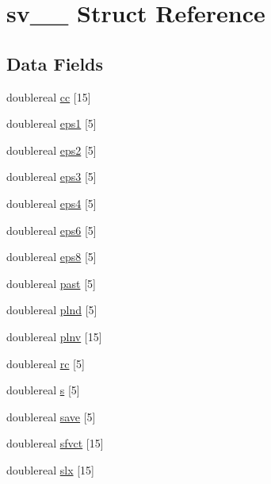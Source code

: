 \hypertarget{structsv__1__}{}\section{sv\+\_\+\_\+ Struct Reference}
\label{structsv__1__}
\subsection*{Data Fields}
\begin{DoxyCompactItemize}
\item 
doublereal \hyperlink{structsv__1___a4d829fa2396825085d8008ef846232d7}{cc} \mbox{[}15\mbox{]}
\item 
doublereal \hyperlink{structsv__1___a36ba7c34fd6dec03e93f0f2ab10cbcf3}{eps1} \mbox{[}5\mbox{]}
\item 
doublereal \hyperlink{structsv__1___ac3ac592537e4af63c79d3e76866a4391}{eps2} \mbox{[}5\mbox{]}
\item 
doublereal \hyperlink{structsv__1___a7defa9e21fe4bce5011ce3d9b0a7b1e9}{eps3} \mbox{[}5\mbox{]}
\item 
doublereal \hyperlink{structsv__1___aa65f22f44615750e1268e5bb8a040393}{eps4} \mbox{[}5\mbox{]}
\item 
doublereal \hyperlink{structsv__1___aa28ef65cbfdceb301d5e6b42a959eff3}{eps6} \mbox{[}5\mbox{]}
\item 
doublereal \hyperlink{structsv__1___a74d64ca6dc191d2553855f82017a089f}{eps8} \mbox{[}5\mbox{]}
\item 
doublereal \hyperlink{structsv__1___a5b1db8c4c47306f0ac441f1c69b197ed}{past} \mbox{[}5\mbox{]}
\item 
doublereal \hyperlink{structsv__1___a275dabf0aa8168ee1f97b4236e8e70e7}{plnd} \mbox{[}5\mbox{]}
\item 
doublereal \hyperlink{structsv__1___aacac114ec75f0d240feb24700d1b1f70}{plnv} \mbox{[}15\mbox{]}
\item 
doublereal \hyperlink{structsv__1___a6570078dd83e74c9e9010377b48621b4}{rc} \mbox{[}5\mbox{]}
\item 
doublereal \hyperlink{structsv__1___aa27f56a6d561835454c4e78f79cbc968}{s} \mbox{[}5\mbox{]}
\item 
doublereal \hyperlink{structsv__1___a66cf511363f6a8ece1800160d76a4216}{save} \mbox{[}5\mbox{]}
\item 
doublereal \hyperlink{structsv__1___a0150b65e0d64c17cb84a00da84f87333}{sfvct} \mbox{[}15\mbox{]}
\item 
doublereal \hyperlink{structsv__1___a8d3f7cabbd595fba649ffab3828bd5f4}{slx} \mbox{[}15\mbox{]}

\end{DoxyCompactItemize}
